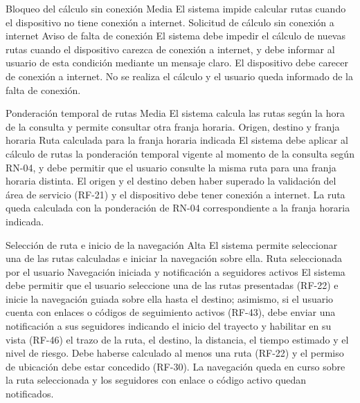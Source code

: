  {Bloqueo del cálculo sin conexión}%
  {Media}%
  {El sistema impide calcular rutas cuando el dispositivo no tiene conexión a internet.}%
  {Solicitud de cálculo sin conexión a internet}%
  {Aviso de falta de conexión}%
  {El sistema debe impedir el cálculo de nuevas rutas cuando el dispositivo carezca de conexión a internet, y debe informar al usuario de esta condición mediante un mensaje claro.}%
  {El dispositivo debe carecer de conexión a internet.}%
  {No se realiza el cálculo y el usuario queda informado de la falta de conexión.}%

  {Ponderación temporal de rutas}%
  {Media}%
  {El sistema calcula las rutas según la hora de la consulta y permite consultar otra franja horaria.}%
  {Origen, destino y franja horaria}%
  {Ruta calculada para la franja horaria indicada}%
  {El sistema debe aplicar al cálculo de rutas la ponderación temporal vigente al momento de la consulta según RN-04, y debe permitir que el usuario consulte la misma ruta para una franja horaria distinta.}%
  {El origen y el destino deben haber superado la validación del área de servicio (RF-21) y el dispositivo debe tener conexión a internet.}%
  {La ruta queda calculada con la ponderación de RN-04 correspondiente a la franja horaria indicada.}%

  {Selección de ruta e inicio de la navegación}%
  {Alta}%
  {El sistema permite seleccionar una de las rutas calculadas e iniciar la navegación sobre ella.}%
  {Ruta seleccionada por el usuario}%
  {Navegación iniciada y notificación a seguidores activos}%
  {El sistema debe permitir que el usuario seleccione una de las rutas presentadas (RF-22) e inicie la navegación guiada sobre ella hasta el destino; asimismo, si el usuario cuenta con enlaces o códigos de seguimiento activos (RF-43), debe enviar una notificación a sus seguidores indicando el inicio del trayecto y habilitar en su vista (RF-46) el trazo de la ruta, el destino, la distancia, el tiempo estimado y el nivel de riesgo.}%
  {Debe haberse calculado al menos una ruta (RF-22) y el permiso de ubicación debe estar concedido (RF-30).}%
  {La navegación queda en curso sobre la ruta seleccionada y los seguidores con enlace o código activo quedan notificados.}%
  
